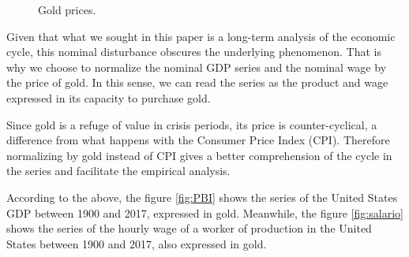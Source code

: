 \documentclass[a4paper,10cpi]{article}
\begin{document}
	\begin{figure}[H]
	\centering
	\caption{Gold prices.} \label{fig:oro}
\end{figure}
	
	Given that what we sought in this paper is a long-term analysis of the economic cycle, this nominal disturbance obscures the underlying phenomenon. That is why we choose to normalize the nominal GDP series and the nominal wage by the price of gold. In this sense, we can read the series as the product and wage expressed in its capacity to purchase gold.
	
	
	Since gold is a refuge of value in crisis periods, its price is counter-cyclical, a difference from what happens with the Consumer Price Index (CPI). Therefore normalizing by gold instead of CPI gives a better comprehension of the cycle in the series and facilitate the empirical analysis.
	
	According to the above, the figure \ref{fig:PBI} shows the series of the United States GDP between 1900 and 2017, expressed in gold. Meanwhile, the figure \ref{fig:salario} shows the series of the hourly wage of a worker of production in the United States between 1900 and 2017, also expressed in gold.
	
\end{document}
